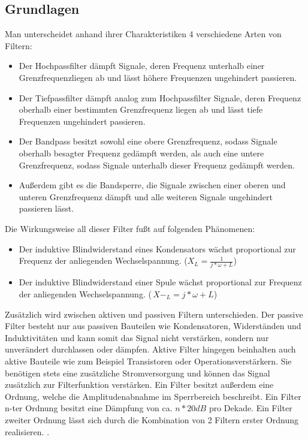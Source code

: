 \subsection{Grundlagen}
Man unterscheidet anhand ihrer Charakteristiken 4 verschiedene Arten von Filtern:
\begin{itemize}
\item Der Hochpassfilter dämpft Signale, deren Frequenz unterhalb einer Grenzfrequenzliegen ab und lässt höhere Frequenzen ungehindert passieren.\cite{skript}
\item Der Tiefpassfilter dämpft analog zum Hochpassfilter Signale, deren Frequenz oberhalb einer bestimmten Grenzfrequenz liegen ab und lässt tiefe Frequenzen ungehindert passieren.\cite{skript}
\item Der Bandpass besitzt sowohl eine obere Grenzfrequenz, sodass Signale oberhalb besagter Frequenz gedämpft werden, als auch eine untere Grenzfrequenz, sodass Signale unterhalb dieser Frequenz gedämpft werden.\cite{skript}
\item Außerdem gibt es die Bandsperre, die Signale zwischen einer oberen und unteren Grenzfrequenz dämpft und alle weiteren Signale ungehindert passieren lässt.\cite{skript}
\end{itemize}
Die Wirkungsweise all dieser Filter fußt auf folgenden Phänomenen:
\begin{itemize}
\item Der induktive Blindwiderstand eines Kondensators wächst proportional zur Frequenz der anliegenden Wechselspannung. ($X_{L}=\frac{1}{j*\omega+L}$) \cite{IBK}
\item Der induktive Blindwiderstand einer Spule wächst proportional zur Frequenz der anliegenden Wechselspannung. ($\,X-_{L}=j*\omega+L$) \cite{IBS}
\end{itemize}
Zusätzlich wird zwischen aktiven und passiven Filtern unterschieden. Der passive Filter besteht nur aus passiven Bauteilen wie Kondensatoren, Widerständen und Induktivitäten und kann somit das Signal nicht verstärken, sondern nur unverändert durchlassen oder dämpfen. 
Aktive Filter hingegen beinhalten auch aktive Bauteile wie zum Beispiel Transistoren oder Operationsverstärkern. Sie benötigen stets eine zusätzliche Stromversorgung und können das Signal zusätzlich zur Filterfunktion verstärken.
Ein Filter besitzt außerdem eine Ordnung, welche die Amplitudenabnahme im Sperrbereich beschreibt. Ein Filter n-ter Ordnung besitzt eine Dämpfung von ca. $n*\si{20}{dB}$ pro Dekade. Ein Filter zweiter Ordnung lässt sich durch die Kombination von 2 Filtern erster  Ordnung realisieren. \cite{DSV}.
